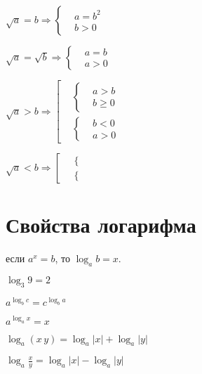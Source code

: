 $ \sqrt{a} = b \Rightarrow  \left\{ \begin{aligned}
	& a = b^2 \\
	& b > 0
\end{aligned}\right. $

$ \sqrt{a} = \sqrt{b} \Rightarrow  \left\{ \begin{aligned}
	& a = b \\
	& a > 0
\end{aligned}\right. $

$ \sqrt{a} > b \Rightarrow  \left[ \begin{aligned}
	& \left\{ \begin{aligned}
		& a > b \\
		& b \geqslant 0
	\end{aligned} \right. \\
	& \left\{ \begin{aligned}
		& b < 0 \\
		& a > 0
	\end{aligned} \right.
\end{aligned} \right. $

$ \sqrt{a} < b \Rightarrow  \left[ \begin{aligned}
	& \left\{ \begin{aligned}
		&  \\
		& 
	\end{aligned} \right. \\
	& \left\{ \begin{aligned}
		&  \\
		& 
	\end{aligned} \right.
\end{aligned} \right. $


\section{Свойства логарифма}

\begin{center}
	если $ a^x = b $, то $ \log_a b = x $.
\end{center}

$ \log_3 9 = 2 $

$ a^{\log_b c} = c^{\log_b a} $

$ a^{\log_a x} = x $

$ \log_a (x\, y) = \log_a |x| + \log_a |y| $

$ \log_a \frac{x}{y} = \log_a |x| - \log_a |y| $

